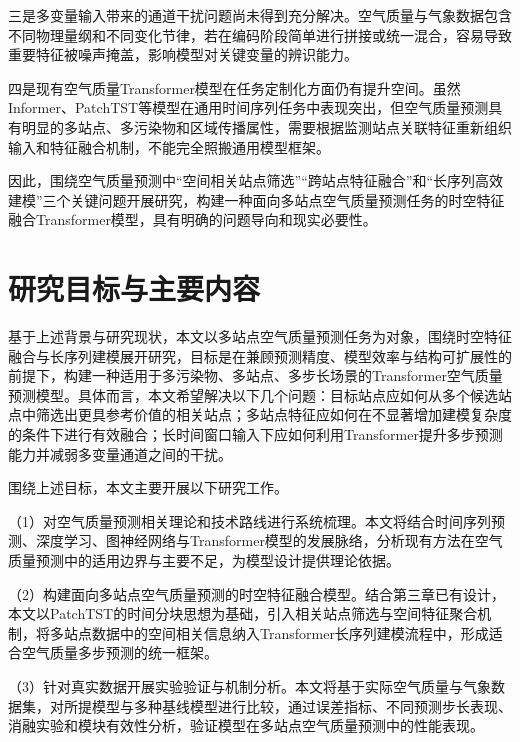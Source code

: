 三是多变量输入带来的通道干扰问题尚未得到充分解决。空气质量与气象数据包含不同物理量纲和不同变化节律，若在编码阶段简单进行拼接或统一混合，容易导致重要特征被噪声掩盖，影响模型对关键变量的辨识能力\cite{nie_time_2023,zeng_are_2023,lim_temporal_2021,wen_transformers_2023}。

四是现有空气质量Transformer模型在任务定制化方面仍有提升空间。虽然Informer、PatchTST等模型在通用时间序列任务中表现突出，但空气质量预测具有明显的多站点、多污染物和区域传播属性，需要根据监测站点关联特征重新组织输入和特征融合机制，不能完全照搬通用模型框架\cite{zhou_informer_2021,wu_autoformer_2021,zhou_fedformer_2022,nie_time_2023,zhang_modeling_2023,zhang_temporal_2022,cai_improving_2023,al-qaness_resinformer_2023,wang_air_2024,zhou_predicting_2024,yu_mgsfformer_2025,liu_intelligent_2025}。

因此，围绕空气质量预测中“空间相关站点筛选”“跨站点特征融合”和“长序列高效建模”三个关键问题开展研究，构建一种面向多站点空气质量预测任务的时空特征融合Transformer模型，具有明确的问题导向和现实必要性。

\section{研究目标与主要内容}

基于上述背景与研究现状，本文以多站点空气质量预测任务为对象，围绕时空特征融合与长序列建模展开研究，目标是在兼顾预测精度、模型效率与结构可扩展性的前提下，构建一种适用于多污染物、多站点、多步长场景的Transformer空气质量预测模型。具体而言，本文希望解决以下几个问题：目标站点应如何从多个候选站点中筛选出更具参考价值的相关站点；多站点特征应如何在不显著增加建模复杂度的条件下进行有效融合；长时间窗口输入下应如何利用Transformer提升多步预测能力并减弱多变量通道之间的干扰。

围绕上述目标，本文主要开展以下研究工作。

（1）对空气质量预测相关理论和技术路线进行系统梳理。本文将结合时间序列预测、深度学习、图神经网络与Transformer模型的发展脉络，分析现有方法在空气质量预测中的适用边界与主要不足，为模型设计提供理论依据。

（2）构建面向多站点空气质量预测的时空特征融合模型。结合第三章已有设计，本文以PatchTST的时间分块思想为基础，引入相关站点筛选与空间特征聚合机制，将多站点数据中的空间相关信息纳入Transformer长序列建模流程中，形成适合空气质量多步预测的统一框架。

（3）针对真实数据开展实验验证与机制分析。本文将基于实际空气质量与气象数据集，对所提模型与多种基线模型进行比较，通过误差指标、不同预测步长表现、消融实验和模块有效性分析，验证模型在多站点空气质量预测中的性能表现。

